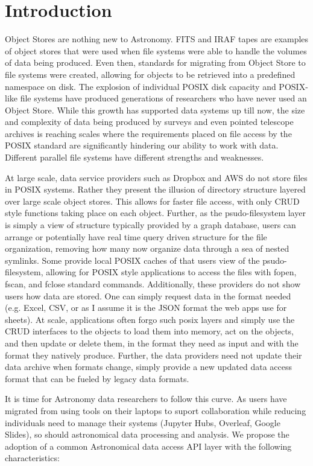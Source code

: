 \section{Introduction} \label{sec:intro}

Object Stores are nothing new to Astronomy.  FITS and IRAF tapes are examples
of object stores that were used when file systems were able to handle the volumes 
of data being produced. Even then, standards for migrating from Object Store to file 
systems were created, allowing for objects to be retrieved into a predefined namespace
on disk.  The explosion of individual POSIX disk capacity and POSIX-like file systems
have produced generations of researchers who have never used an Object Store. While
this growth has supported data systems up till now, the size and complexity of
data being produced by surveys and even pointed telescope archives is reaching
scales where the requirements placed on file access by the POSIX standard are 
significantly hindering our ability to work with data.  Different parallel file systems
have different strengths and weaknesses.  

At large scale, data service providers such as Dropbox and AWS do not store files
in POSIX systems.  Rather they present the illusion of directory structure layered over 
large scale object stores. This allows for faster file access, with only CRUD style
functions taking place on each object.  Further, as the psudo-filesystem layer is simply a 
view of structure typically provided by a graph database, users can arrange or potentially
have real time query driven structure for the file organization, removing how many now 
organize data through a sea of nested symlinks.
Some provide local POSIX caches of that users view of the 
psudo-filesystem, allowing for POSIX style applications to access the files with
fopen, fscan, and fclose standard commands. Additionally, these providers do 
not show users how data are stored. One can simply request data in the format 
needed (e.g. Excel, CSV, or as I assume it is the JSON format the web apps
use for sheets).   At scale, applications often forgo
such posix layers and simply use the CRUD interfaces to the objects to load them into 
memory, act on the objects, and then update or delete them, in the format they need
as input and with the format they natively produce. Further, the data providers need
not update their data archive when formats change, simply provide a new updated
data access format that can be fueled by legacy data formats.

It is time for Astronomy data researchers to follow this curve. As users have migrated
from using tools on their laptops to suport collaboration while reducing
individuals need to manage their systems (Jupyter Hubs, Overleaf, Google Slides), 
so should astronomical data processing and analysis. We propose the adoption of
a common Astronomical data access API layer with the following characteristics:



